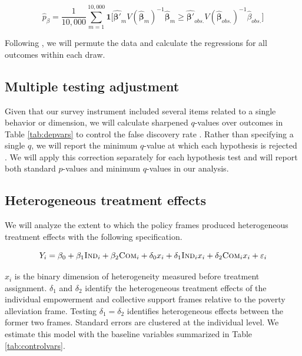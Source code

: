 \documentclass[11pt, a4paper]{article}\usepackage[]{graphicx}\usepackage[]{color}
\begin{document}
        \begin{equation} \label{eq:exactp}
            \hat{p}_{\beta} =  \frac{1}{10,000}\sum_{m=1}^{10,000} \mathbf{1} \Big [ \mathbf{\hat{\beta'}}_m V(\mathbf{\hat{\beta}}_m)^{-1} \mathbf{\hat{\beta}}_m \geq \mathbf{\hat{\beta'}}_{obs.} V(\mathbf{\hat{\beta}}_{obs.})^{-1} \hat{\beta}_{obs.} \Big ]
        \end{equation}

        Following \textcite{young_channeling_2015}, we will permute the data and calculate the regressions for all outcomes within each draw.

    \subsection{Multiple testing adjustment}

        Given that our survey instrument included several items related to a single behavior or dimension, we will calculate sharpened $q$-values over outcomes in Table \ref{tab:depvars} to control the false discovery rate \parencite{benjamini_adaptive_2006}. Rather than specifying a single $q$, we will report the minimum $q$-value at which each hypothesis is rejected \parencite{anderson_multiple_2008}. We will apply this correction separately for each hypothesis test and will report both standard $p$-values and minimum $q$-values in our analysis.

    \subsection{Heterogeneous treatment effects}

        We will analyze the extent to which the policy frames produced heterogeneous treatment effects with the following specification.

        \begin{equation}
            Y_{i} = \beta_{0} + \beta_{1}\text{\textsc{Ind}}_{i} + \beta_{2}\text{\textsc{Com}}_{i} + \delta_{0} x_i + \delta_{1}\text{\textsc{Ind}}_{i} x_i + \delta_{2}\text{\textsc{Com}}_{i} x_i + \varepsilon_{i}
        \label{eq:heteffect} \end{equation}

        $x_{i}$ is the binary dimension of heterogeneity measured before treatment assignment. $\delta_{1}$ and $\delta_{2}$ identify the heterogeneous treatment effects of the individual empowerment and collective support frames relative to the poverty alleviation frame. Testing $\delta_{1} = \delta_{2}$ identifies heterogeneous effects between the former two frames. Standard errors are clustered at the individual level. We estimate this model with the baseline variables summarized in Table \ref{tab:controlvars}.
\end{document}
